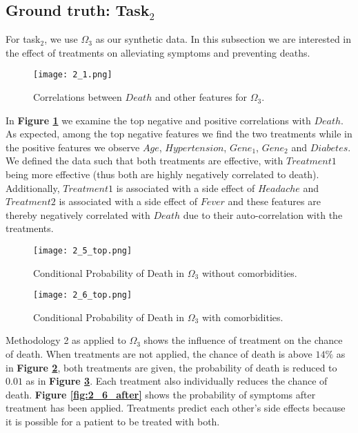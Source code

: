 \subsection{Ground truth: Task$_2$}
\graphicspath{{pictures/task2/}}
For task$_2$, we use $\Omega_3$ as our synthetic data. In this subsection we are interested in the effect of treatments on alleviating symptoms and preventing deaths.


\begin{figure}[H]
  \texttt{[image: 2\_1.png]}
  \caption{Correlations between $Death$ and other features for $\Omega_3$.}
    \label{fig:2_1}
\end{figure}

In \textbf{Figure \ref{fig:2_1}} we examine the top negative and positive correlations with $Death$. As expected, among the top negative features we find the two treatments while in the positive features we observe $Age$, $Hypertension$, $Gene_1$, $Gene_2$ and $Diabetes$. We defined the data such that both treatments are effective, with $Treatment 1$ being more effective (thus both are highly negatively correlated to death). Additionally, $Treatment 1$ is associated with a side effect of $Headache$ and $Treatment 2$ is associated with a side effect of $Fever$ and these features are thereby negatively correlated with $Death$ due to their auto-correlation with the treatments. 

\begin{figure}[H]
  \texttt{[image: 2\_5\_top.png]}
  \caption{Conditional Probability of Death in $\Omega_3$ without comorbidities.}
    \label{fig:2_5}
\end{figure}

\begin{figure}[H]
  \texttt{[image: 2\_6\_top.png]}
  \caption{Conditional Probability of Death in $\Omega_3$ with comorbidities.}
    \label{fig:2_6}
\end{figure}

Methodology 2 as applied to $\Omega_3$ shows the influence of treatment on the chance of death. When treatments are not applied, the chance of death is above $14\%$ as in \textbf{Figure \ref{fig:2_5}}, both treatments are given, the probability of death is reduced to $0.01$ as in \textbf{Figure \ref{fig:2_6}}. Each treatment also individually reduces the chance of death. \textbf{Figure \ref{fig:2_6_after}} shows the probability of symptoms after treatment has been applied. Treatments predict each other's side effects because it is possible for a patient to be treated with both.


